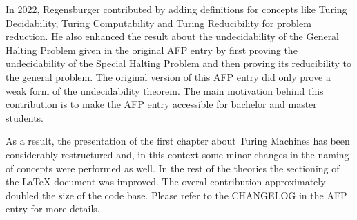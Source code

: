 \documentclass{report}
\begin{document}
In 2022, Regensburger contributed by adding definitions for
concepts like Turing Decidability, Turing Computability and Turing Reducibility
for problem reduction. He also enhanced the result about the
undecidability of the General Halting Problem given in the original AFP entry
by first proving the undecidability of the Special Halting Problem and then
proving its reducibility to the general problem. The original version of this
AFP entry did only prove a weak form of the undecidability theorem.
The main motivation behind this contribution is to make the AFP entry
accessible for bachelor and master students.

As a result, the presentation of the first chapter about Turing
Machines has been considerably restructured and, in this context some minor
changes in the naming of concepts were performed as well. In the rest of the theories
the sectioning of the \LaTeX{} document was improved.
The overal contribution approximately doubled the size of the code base.
Please refer to the CHANGELOG in the AFP entry for more details.





\end{document}
